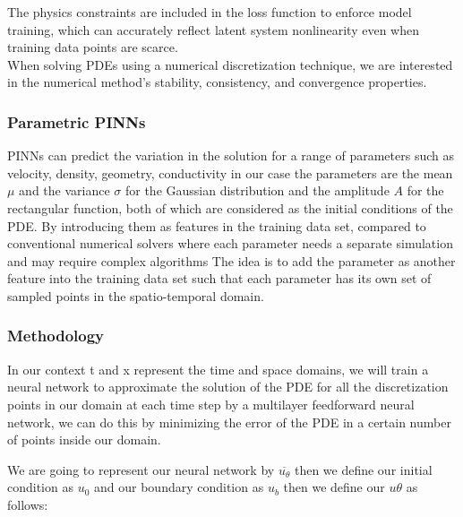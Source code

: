 \documentclass{article}
\begin{document}

The physics constraints are included in the loss function to enforce model training, which can accurately reflect latent system nonlinearity even when training data points are scarce.\\


When solving PDEs using a numerical discretization technique, we are
interested in the numerical method’s stability, consistency, and convergence properties.\\


\subsubsection{Parametric PINNs}

PINNs can predict the variation in the solution for a range of parameters such as velocity, density, geometry, conductivity in our case the parameters are the mean $\mu$ and the variance $\sigma$ for the Gaussian distribution and the amplitude $A$ for the rectangular function, both of which are considered as the initial conditions of the PDE.
By introducing them as features in the training data set, compared to conventional numerical solvers where each parameter needs a separate simulation and may require complex algorithms The idea is to add the parameter as another feature into the training data set such that each parameter has its own set of sampled points in the spatio-temporal domain.



\subsubsection{Methodology}

In our context t and x represent the time and space domains, we will train a neural network to approximate the solution of the PDE for all the discretization points in our domain 
at each time step  by a multilayer feedforward neural network, we can do this by minimizing the error of the PDE in a certain number of points inside our domain.

We are going to represent our neural network by $\overline{u_\theta}$ then we define our initial condition as $u_0$ and our boundary condition as $u_b$ then we define our $u\theta$ as follows:
\end{document}
